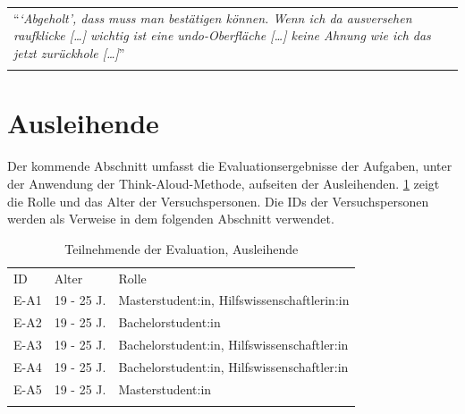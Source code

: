 \begin{longtable}{p{}} \arrayrulecolor{maincolor}\hline
  \enquote{\textit{\enquote{Abgeholt}, dass muss man bestätigen können. Wenn ich
  da ausversehen raufklicke [\dots] wichtig ist eine undo-Oberfläche [\dots]
  keine Ahnung wie ich das jetzt zurückhole [\dots]}} \\
  \arrayrulecolor{maincolor}\hline
\end{longtable}

\section{Ausleihende}

Der kommende Abschnitt umfasst die Evaluationsergebnisse der Aufgaben, unter der
Anwendung der Think-Aloud-Methode, aufseiten der Ausleihenden. \ref{table:azwei}
zeigt die Rolle und das Alter der Versuchspersonen. Die IDs der Versuchspersonen
werden als Verweise in dem folgenden Abschnitt verwendet.

\begin{table}[h]
  \centering
  \caption{Teilnehmende der Evaluation, Ausleihende}
  \begin{tabular}{lll}
    \arrayrulecolor{maincolor}\hline
    \sffamily\color{maincolor}ID & \sffamily\color{maincolor}Alter &
    \sffamily\color{maincolor}Rolle                                  \\
    \arrayrulecolor{maincolor}\hline
    E-A1                         & 19 - 25 J.                      &
    Masterstudent:in, Hilfswissenschaftlerin:in                      \\
    E-A2                         & 19 - 25 J.                      &
    Bachelorstudent:in                                               \\
    E-A3                         & 19 - 25 J.                      &
    Bachelorstudent:in, Hilfswissenschaftler:in                      \\
    E-A4                         & 19 - 25 J.                      &
    Bachelorstudent:in, Hilfswissenschaftler:in                      \\
    E-A5                         & 19 - 25 J.                      &
    Masterstudent:in                                                 \\
    \arrayrulecolor{maincolor}\hline
  \end{tabular}
  \label{table:azwei}
\end{table}

